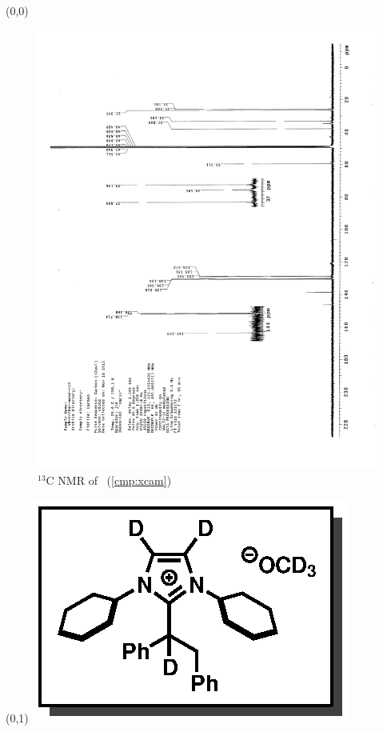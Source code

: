 \clearpage
\begin{textblock}{20}(0,0)
\begin{figure}[htb]
\caption{$^{13}$C NMR of  \CMPxcam\ (\ref{cmp:xcam})}
\includegraphics[scale=0.75, trim = 0mm 0mm 0mm 5mm,
clip]{chp_alkylation/images/nmr/xcamC}
\vspace{-100pt}
\end{figure}
\end{textblock}
\begin{textblock}{1}(0,1)
\includegraphics[scale=0.8, angle=90]{chp_alkylation/images/xcam}
\end{textblock}
\clearpage

